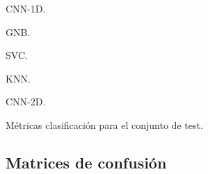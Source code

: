     \begin{table}[H]
        \scriptsize
        \renewcommand{\arraystretch}{1.1}

        \begin{subtable}{.5\textwidth}     
          \caption{CNN-1D.}
          \label{TestClassificationReport:CNN1D}
        \end{subtable}
        \hspace{1em}
        \begin{subtable}{.5\textwidth}
          \caption{GNB.}
          \label{TestClassificationReport:GNB}
        \end{subtable}
        \vspace*{0.5 cm}
        \begin{subtable}{.5\textwidth}     
          \centering
          \caption{SVC.}
          \label{TestClassificationReport:SVC}
        \end{subtable}
        \hspace{1em}
        \begin{subtable}{.5\textwidth}     
          \caption{KNN.}
          \label{TestClassificationReport:KNN}
        \end{subtable}
        \vspace*{0.5 cm}
        \begin{subtable}{1\textwidth}     
          \centering
          \caption{CNN-2D.}
          \label{TestClassificationReport:CNN2D}
        \end{subtable}

      \caption{Métricas clasificación para el conjunto de test.}
      \label{TestClassificationReport}
    \end{table}


  \subsection{Matrices de confusión}

